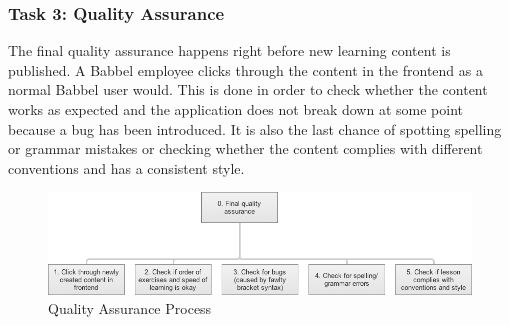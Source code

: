 



\subsubsection{Task 3: Quality Assurance} \label{sec:task-qa}
The final quality assurance happens right before new learning content is published. A Babbel employee clicks through the content in the frontend as a normal Babbel user would. This is done in order to check whether the content works as expected and the application does not break down at some point because a bug has been introduced. It is also the last chance of spotting spelling or grammar mistakes or checking whether the content complies with different conventions and has a consistent style.

\begin{figure}[h]
 \centering
 \includegraphics[width=\textwidth]{images/task-analysis/quality_assurance}
 \caption{Quality Assurance Process}
 \label{fig:qa-process}
\end{figure}

